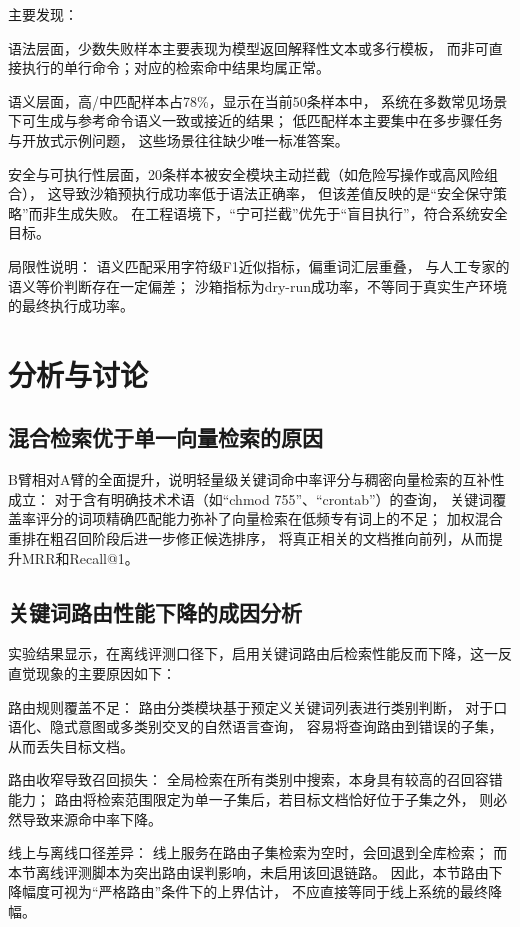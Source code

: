主要发现：

语法层面，少数失败样本主要表现为模型返回解释性文本或多行模板，
而非可直接执行的单行命令；对应的检索命中结果均属正常。

语义层面，高/中匹配样本占78\%，显示在当前50条样本中，
系统在多数常见场景下可生成与参考命令语义一致或接近的结果；
低匹配样本主要集中在多步骤任务与开放式示例问题，
这些场景往往缺少唯一标准答案。

安全与可执行性层面，20条样本被安全模块主动拦截（如危险写操作或高风险组合），
这导致沙箱预执行成功率低于语法正确率，
但该差值反映的是“安全保守策略”而非生成失败。
在工程语境下，“宁可拦截”优先于“盲目执行”，符合系统安全目标。

局限性说明：
语义匹配采用字符级F1近似指标，偏重词汇层重叠，
与人工专家的语义等价判断存在一定偏差；
沙箱指标为dry-run成功率，不等同于真实生产环境的最终执行成功率。

\section{分析与讨论}

\subsection{混合检索优于单一向量检索的原因}

B臂相对A臂的全面提升，说明轻量级关键词命中率评分与稠密向量检索的互补性成立：
对于含有明确技术术语（如“chmod 755”、“crontab”）的查询，
关键词覆盖率评分的词项精确匹配能力弥补了向量检索在低频专有词上的不足；
加权混合重排在粗召回阶段后进一步修正候选排序，
将真正相关的文档推向前列，从而提升MRR和Recall@1。

\subsection{关键词路由性能下降的成因分析}

实验结果显示，在离线评测口径下，启用关键词路由后检索性能反而下降，这一反直觉现象的主要原因如下：

路由规则覆盖不足：
路由分类模块基于预定义关键词列表进行类别判断，
对于口语化、隐式意图或多类别交叉的自然语言查询，
容易将查询路由到错误的子集，从而丢失目标文档。

路由收窄导致召回损失：
全局检索在所有类别中搜索，本身具有较高的召回容错能力；
路由将检索范围限定为单一子集后，若目标文档恰好位于子集之外，
则必然导致来源命中率下降。

线上与离线口径差异：
线上服务在路由子集检索为空时，会回退到全库检索；
而本节离线评测脚本为突出路由误判影响，未启用该回退链路。
因此，本节路由下降幅度可视为“严格路由”条件下的上界估计，
不应直接等同于线上系统的最终降幅。


